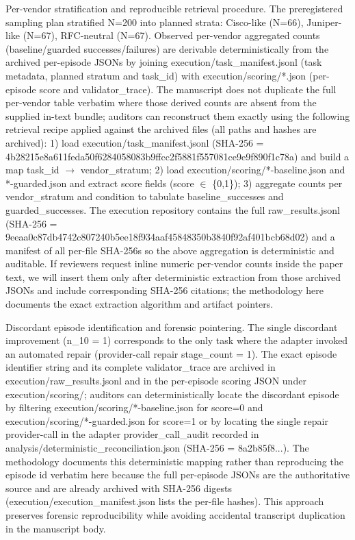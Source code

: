 \documentclass[conference]{IEEEtran}
\begin{document}
Per-vendor stratification and reproducible retrieval procedure. The preregistered sampling plan stratified N=200 into planned strata: Cisco-like (N=66), Juniper-like (N=67), RFC-neutral (N=67). Observed per-vendor aggregated counts (baseline/guarded successes/failures) are derivable deterministically from the archived per-episode JSONs by joining execution/task\_manifest.jsonl (task metadata, planned stratum and task\_id) with execution/scoring/*.json (per-episode score and validator\_trace). The manuscript does not duplicate the full per-vendor table verbatim where those derived counts are absent from the supplied in-text bundle; auditors can reconstruct them exactly using the following retrieval recipe applied against the archived files (all paths and hashes are archived):
1) load execution/task\_manifest.jsonl (SHA-256 = 4b28215e8a611feda50f6284058083b9ffcc2f5881f557081ce9e9f890f1c78a) and build a map task\_id \ensuremath{\rightarrow} vendor\_stratum;
2) load execution/scoring/*-baseline.json and *-guarded.json and extract score fields (score \ensuremath{\in} \{0,1\});
3) aggregate counts per vendor\_stratum and condition to tabulate baseline\_successes and guarded\_successes. The execution repository contains the full raw\_results.jsonl (SHA-256 = 9eeaa0c87db4742c807240b5ee18f934aaf45848350b3840f92af401bcb68d02) and a manifest of all per-file SHA-256s so the above aggregation is deterministic and auditable. If reviewers request inline numeric per-vendor counts inside the paper text, we will insert them only after deterministic extraction from those archived JSONs and include corresponding SHA-256 citations; the methodology here documents the exact extraction algorithm and artifact pointers.

Discordant episode identification and forensic pointering. The single discordant improvement (n\_10 = 1) corresponds to the only task where the adapter invoked an automated repair (provider-call repair stage\_count = 1). The exact episode identifier string and its complete validator\_trace are archived in execution/raw\_results.jsonl and in the per-episode scoring JSON under execution/scoring/; auditors can deterministically locate the discordant episode by filtering execution/scoring/*-baseline.json for score=0 and execution/scoring/*-guarded.json for score=1 or by locating the single repair provider-call in the adapter provider\_call\_audit recorded in analysis/deterministic\_reconciliation.json (SHA-256 = 8a2b85f8...). The methodology documents this deterministic mapping rather than reproducing the episode id verbatim here because the full per-episode JSONs are the authoritative source and are already archived with SHA-256 digests (execution/execution\_manifest.json lists the per-file hashes). This approach preserves forensic reproducibility while avoiding accidental transcript duplication in the manuscript body.
\end{document}
